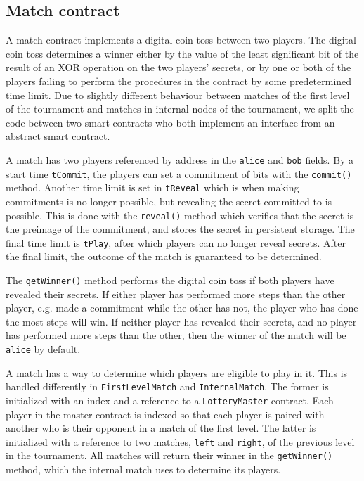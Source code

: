 

\subsection{Match contract}
A match contract implements a digital coin toss between two players. The digital coin toss determines a winner either by the value of the least significant bit of the result of an XOR operation on the two players' secrets, or by one or both of the players failing to perform the procedures in the contract by some predetermined time limit.
Due to slightly different behaviour between matches of the first level of the tournament and matches in internal nodes of the tournament, we split the code between two smart contracts who both implement an interface from an abstract smart contract.

A match has two players referenced by address in the \texttt{alice} and \texttt{bob} fields. By a start time \texttt{tCommit}, the players can set a commitment of bits with the \texttt{commit()} method. Another time limit is set in \texttt{tReveal} which is when making commitments is no longer possible, but revealing the secret committed to is possible. This is done with the \texttt{reveal()} method which verifies that the secret is the preimage of the commitment, and stores the secret in persistent storage. The final time limit is \texttt{tPlay}, after which players can no longer reveal secrets. After the final limit, the outcome of the match is guaranteed to be determined.

The \texttt{getWinner()} method performs the digital coin toss if both players have revealed their secrets. If either player has performed more steps than the other player, e.g. made a commitment while the other has not, the player who has done the most steps will win. If neither player has revealed their secrets, and no player has performed more steps than the other, then the winner of the match will be \texttt{alice} by default.

A match has a way to determine which players are eligible to play in it. This is handled differently in \texttt{FirstLevelMatch} and \texttt{InternalMatch}. The former is initialized with an index and a reference to a \texttt{LotteryMaster} contract. Each player in the master contract is indexed so that each player is paired with another who is their opponent in a match of the first level. The latter is initialized with a reference to two matches, \texttt{left} and \texttt{right}, of the previous level in the tournament. All matches will return their winner in the \texttt{getWinner()} method, which the internal match uses to determine its players. 

